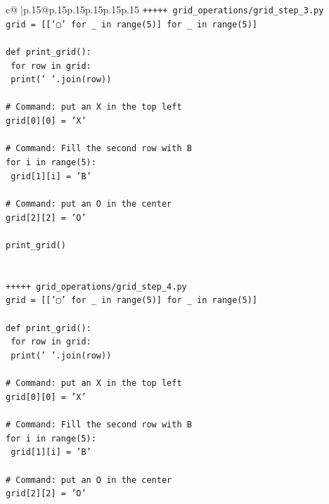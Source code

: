 \documentclass{article}
\begin{document}
{\begin{supertabular}{c@{$\;$}|p{.15\linewidth}@{}p{.15\linewidth}p{.15\linewidth}p{.15\linewidth}p{.15\linewidth}p{.15\linewidth}}
{{{\texttt{+++++ grid\_operations/grid\_step\_3.py} \\
\texttt{grid = {[}{[}'▢' for \_ in range(5){]} for \_ in range(5){]}} \\
\\ 
\texttt{def print\_grid():} \\
\texttt{    for row in grid:} \\
\texttt{        print(' '.join(row))} \\
\\ 
\texttt{\# Command: put an X in the top left} \\
\texttt{grid{[}0{]}{[}0{]} = 'X'} \\
\\ 
\texttt{\# Command: Fill the second row with B} \\
\texttt{for i in range(5):} \\
\texttt{    grid{[}1{]}{[}i{]} = 'B'} \\
\\ 
\texttt{\# Command: put an O in the center} \\
\texttt{grid{[}2{]}{[}2{]} = 'O'} \\
\\ 
\texttt{print\_grid()} \\
\\ 
\\ 
\texttt{+++++ grid\_operations/grid\_step\_4.py} \\
\texttt{grid = {[}{[}'▢' for \_ in range(5){]} for \_ in range(5){]}} \\
\\ 
\texttt{def print\_grid():} \\
\texttt{    for row in grid:} \\
\texttt{        print(' '.join(row))} \\
\\ 
\texttt{\# Command: put an X in the top left} \\
\texttt{grid{[}0{]}{[}0{]} = 'X'} \\
\\ 
\texttt{\# Command: Fill the second row with B} \\
\texttt{for i in range(5):} \\
\texttt{    grid{[}1{]}{[}i{]} = 'B'} \\
\\ 
\texttt{\# Command: put an O in the center} \\
\texttt{grid{[}2{]}{[}2{]} = 'O'} \\
\\ 
}}}
\end{supertabular}}
\end{document}
